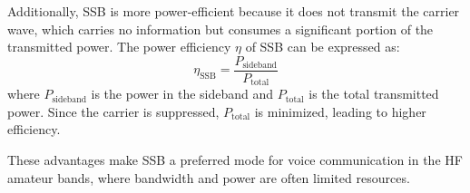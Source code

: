 Additionally, SSB is more power-efficient because it does not transmit the carrier wave, which carries no information but consumes a significant portion of the transmitted power. The power efficiency \( \eta \) of SSB can be expressed as:
\[ \eta_{\text{SSB}} = \frac{P_{\text{sideband}}}{P_{\text{total}}} \]
where \( P_{\text{sideband}} \) is the power in the sideband and \( P_{\text{total}} \) is the total transmitted power. Since the carrier is suppressed, \( P_{\text{total}} \) is minimized, leading to higher efficiency.

These advantages make SSB a preferred mode for voice communication in the HF amateur bands, where bandwidth and power are often limited resources.

